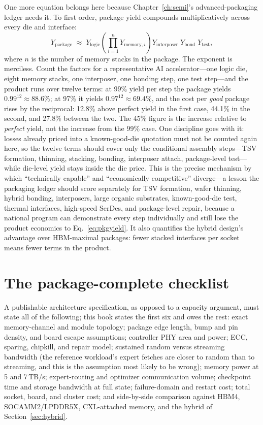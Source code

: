 One more equation belongs here because Chapter~\ref{ch:semi}'s advanced-packaging ledger needs it. To first order, package yield compounds multiplicatively across every die and interface:
\begin{equation}
Y_{\mathrm{package}} \;\approx\; Y_{\mathrm{logic}} \left(\prod_{i=1}^{n} Y_{\mathrm{memory},i}\right) Y_{\mathrm{interposer}}\; Y_{\mathrm{bond}}\; Y_{\mathrm{test}},
\label{eq:pkgyield}
\end{equation}
where $n$ is the number of memory stacks in the package. The exponent is merciless. Count the factors for a representative AI accelerator---one logic die, eight memory stacks, one interposer, one bonding step, one test step---and the product runs over twelve terms: at 99\% yield per step the package yields $0.99^{12} \approx 88.6\%$; at 97\% it yields $0.97^{12} \approx 69.4\%$, and the cost per \emph{good} package rises by the reciprocal: 12.8\% above perfect yield in the first case, 44.1\% in the second, and 27.8\% between the two. The 45\% figure is the increase relative to \emph{perfect} yield, not the increase from the 99\% case. One discipline goes with it: losses already priced into a known-good-die quotation must not be counted again here, so the twelve terms should cover only the conditional assembly steps---TSV formation, thinning, stacking, bonding, interposer attach, package-level test---while die-level yield stays inside the die price. This is the precise mechanism by which ``technically capable'' and ``economically competitive'' diverge---a lesson the packaging ledger should score separately for TSV formation, wafer thinning, hybrid bonding, interposers, large organic substrates, known-good-die test, thermal interfaces, high-speed SerDes, and package-level repair, because a national program can demonstrate every step individually and still lose the product economics to Eq.~\eqref{eq:pkgyield}. It also quantifies the hybrid design's advantage over HBM-maximal packages: fewer stacked interfaces per socket means fewer terms in the product.

\section{The package-complete checklist}

A publishable architecture specification, as opposed to a capacity argument, must state all of the following; this book states the first six and owes the rest: exact memory-channel and module topology; package edge length, bump and pin density, and board escape assumptions; controller PHY area and power; ECC, sparing, chipkill, and repair model; sustained random versus streaming bandwidth (the reference workload's expert fetches are closer to random than to streaming, and this is the assumption most likely to be wrong); memory power at 5 and 7\,TB/s; expert-routing and optimizer communication volume; checkpoint time and storage bandwidth at full state; failure-domain and restart cost; total socket, board, and cluster cost; and side-by-side comparison against HBM4, SOCAMM2/LPDDR5X, CXL-attached memory, and the hybrid of Section~\ref{sec:hybrid}.

